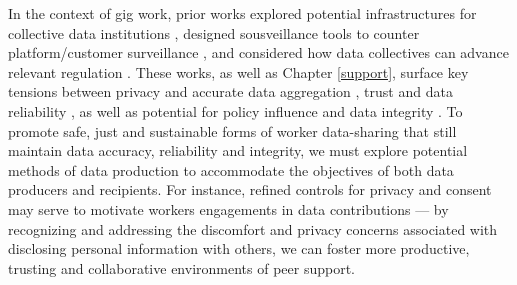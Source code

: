 In the context of gig work, prior works explored potential infrastructures for collective data institutions \cite{uuapp}, designed sousveillance tools to counter platform/customer surveillance \cite{sousveillance, privacy}, and considered how data collectives can advance relevant regulation \cite{collectives}. These works, as well as Chapter \ref{support}, surface key tensions between privacy and accurate data aggregation \cite{privacy}, trust and data reliability \cite{uuapp}, as well as potential for policy influence and data integrity \cite{supporting}. To promote safe, just and sustainable forms of worker data-sharing that still maintain data accuracy, reliability and integrity, we must explore potential methods of data production to accommodate the objectives of both data producers and recipients. For instance, refined controls for privacy and consent may serve to motivate workers engagements in data contributions --- 
by recognizing and addressing the discomfort and privacy concerns associated with disclosing personal information with others, we can foster more productive, trusting and collaborative environments of peer support.





